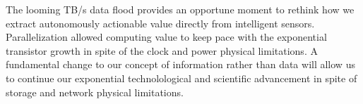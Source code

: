 \documentclass{article}
\begin{document}
The looming TB/s data flood provides an opportune moment to rethink how we extract autonomously actionable value directly from intelligent sensors.
Parallelization allowed computing value to keep pace with the exponential transistor growth in spite of the clock and power physical limitations.
A fundamental change to our concept of information rather than data will allow us to continue our exponential technolological and scientific advancement in spite of storage and network physical limitations.




\end{document}
